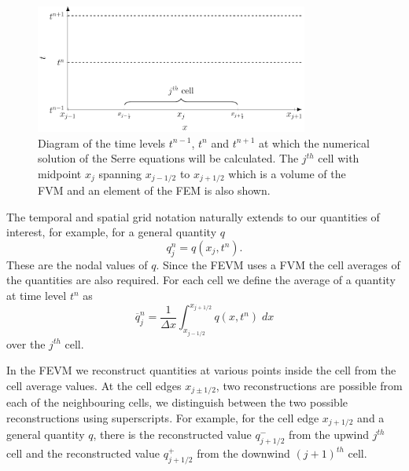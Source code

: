 \begin{figure}
	\centering
	\includegraphics[width=0.8\textwidth]{./chp3/figures/Discretisation.pdf}
	\caption{Diagram of the time levels $t^{n-1}$, $t^n$ and $t^{n+1}$ at which the numerical solution of the Serre equations will be calculated. The $j^{th}$ cell with midpoint $x_{j}$ spanning $x_{j-1/2}$ to $x_{j+1/2}$ which is a volume of the FVM and an element of the FEM is also shown.}
	\label{fig:NumericalGrid}
\end{figure}

The temporal and spatial grid notation naturally extends to our quantities of interest, for example, for a general quantity $q$
\begin{equation*}
q^n_j = q(x_j ,t^n). 
\end{equation*}
These are the nodal values of $q$. Since the FEVM uses a FVM the cell averages of the quantities are also required. For each cell we define the average of a quantity at time level $t^n$ as
\begin{equation*}
\overline{q}_j^n = \frac{1}{\Delta x} \int_{x_{j-1/2}}^{x_{j+1/2}} q(x,t^n) \; dx
\end{equation*}
over the $j^{th}$ cell.

In the FEVM we reconstruct quantities at various points inside the cell from the cell average values. At the cell edges $x_{j\pm1/2}$, two reconstructions are possible from each of the neighbouring cells, we distinguish between the two possible reconstructions using superscripts. For example, for the cell edge $x_{j+1/2}$ and a general quantity $q$, there is the reconstructed value $q^-_{j+1/2}$ from the upwind $j^{th}$ cell and the reconstructed value $q^+_{j+1/2}$ from the downwind $(j+1)^{th}$ cell.

